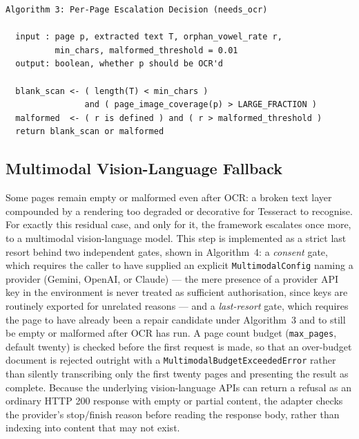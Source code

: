 \documentclass[12pt,a4paper,oneside]{report}
\begin{document}
\begin{verbatim}
Algorithm 3: Per-Page Escalation Decision (needs_ocr)

  input : page p, extracted text T, orphan_vowel_rate r,
          min_chars, malformed_threshold = 0.01
  output: boolean, whether p should be OCR'd

  blank_scan <- ( length(T) < min_chars )
                and ( page_image_coverage(p) > LARGE_FRACTION )
  malformed  <- ( r is defined ) and ( r > malformed_threshold )
  return blank_scan or malformed
\end{verbatim}

\subsection{Multimodal Vision-Language Fallback}
\label{sec:impl-multimodal}
Some pages remain empty or malformed even after OCR: a broken text layer compounded by a rendering too degraded or decorative for Tesseract to recognise. For exactly this residual case, and only for it, the framework escalates once more, to a multimodal vision-language model. This step is implemented as a strict last resort behind two independent gates, shown in Algorithm~4: a \textit{consent} gate, which requires the caller to have supplied an explicit \texttt{MultimodalConfig} naming a provider (Gemini, OpenAI, or Claude) — the mere presence of a provider API key in the environment is never treated as sufficient authorisation, since keys are routinely exported for unrelated reasons — and a \textit{last-resort} gate, which requires the page to have already been a repair candidate under Algorithm~3 and to still be empty or malformed after OCR has run. A page count budget (\texttt{max\_pages}, default twenty) is checked before the first request is made, so that an over-budget document is rejected outright with a \texttt{MultimodalBudgetExceededError} rather than silently transcribing only the first twenty pages and presenting the result as complete. Because the underlying vision-language APIs can return a refusal as an ordinary HTTP 200 response with empty or partial content, the adapter checks the provider's stop/finish reason before reading the response body, rather than indexing into content that may not exist.
\end{document}
